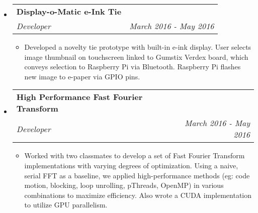 \documentclass[letterpaper,11pt]{article}
\makeatletter
\newcommand{\resitem}[1]{\item #1 \vspace{-2pt}}
\newcommand{\ressubheading}[4]{
\begin{tabular*}{7.0in}{l@{\extracolsep{\fill}}r}
    \textbf{#1} & #2 \\
    \textit{#3} & \textit{#4} \\
\end{tabular*}\vspace{-6pt}}
\makeatother
\begin{document}
\begin{itemize}
\item
\ressubheading{Display-o-Matic e-Ink Tie}{}{Developer}{March 2016 - May 2016}
\begin{itemize}
\resitem{Developed a novelty tie prototype with built-in e-ink display. User selects image thumbnail on touchscreen linked to Gumstix Verdex board, which conveys selection to Raspberry Pi via Bluetooth. Raspberry Pi flashes new image to e-paper via GPIO pins.}
\end{itemize}

\item
\ressubheading{High Performance Fast Fourier Transform}{}{Developer}{March 2016 - May 2016}
\begin{itemize}
\resitem{Worked with two classmates to develop a set of Fast Fourier Transform implementations with varying degrees of optimization. Using a naive, serial FFT as a baseline, we applied high-performance methods (eg: code motion, blocking, loop unrolling, pThreads, OpenMP) in various combinations to maximize efficiency. Also wrote a CUDA implementation to utilize GPU parallelism.}
\end{itemize}


\end{itemize}


\end{document}
